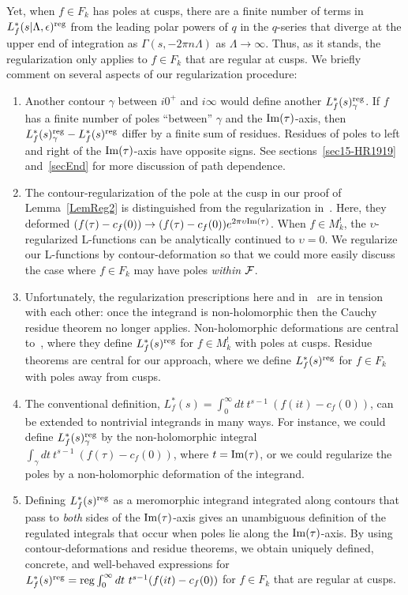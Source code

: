 \documentclass[11pt,a4paper]{article}
\newcommand{\g}{\gamma}
\newcommand{\e}{\epsilon}
\newcommand{\G}{\Gamma}
\newcommand{\La}{\Lambda}
\newcommand{\up}{\upsilon}
\newcommand{\reg}{{\rm reg}}
\begin{document}
Yet, when $f \in F_k$ has poles at cusps, there are a finite number of terms in $L_f^*(s|\La,\e)^\reg$ from the leading polar powers of $q$ in the $q$-series that diverge at the upper end of integration as $\G(s,-2\pi n \La)$ as $\La \to \infty$. Thus, as it stands, the regularization only applies to $f \in F_k$ that are regular at cusps. We briefly comment on several aspects of our regularization procedure:
\begin{enumerate}
\item Another contour $\g$ between $i0^+$ and $i \infty$ would define another $L_f^*(s)^\reg_{\g}$. If $f$ has a finite number of poles ``between'' $\g$ and the ${\rm Im}(\tau)$-axis, then $L_f^*(s)^\reg_{\g} - L_f^*(s)^\reg$ differ by a finite sum of residues. Residues of poles to left and right of the ${\rm Im}(\tau)$-axis have opposite signs. See sections~\ref{sec15-HR1919} and~\ref{secEnd} for more discussion of path dependence.
\item The contour-regularization of the pole at the cusp in our proof of Lemma~\ref{LemReg2} is distinguished from the regularization in~\cite{03-BFI, 04-BFK, 05-BFK2}. Here, they deformed $(f(\tau)-c_f(0)) \to (f(\tau)-c_f(0)) e^{2 \pi \up {\rm Im}(\tau)}$. When $f \in M_k^!$, the $\up$-regularized L-functions can be analytically continued to $\up = 0$. We regularize our L-functions by contour-deformation so that we could more easily discuss the case where $f \in F_k$ may have poles {\em within} ${\cal F}$. 
\item Unfortunately, the regularization prescriptions here and in~\cite{04-BFK} are in tension with each other: once the integrand is non-holomorphic then the Cauchy residue theorem no longer applies. Non-holomorphic deformations are central to~\cite{04-BFK}, where they define $L_f^*(s)^\reg$ for $f \in M_k^!$ with poles at cusps. Residue theorems are central for our approach, where we define $L_f^*(s)^\reg$ for $f \in F_k$ with poles away from cusps.
\item The conventional definition, $L_f^*(s) = \int_{0}^{\infty} dt~t^{s-1}~(f(it)-c_f(0))$, can be extended to nontrivial integrands in many ways. For instance, we could define $L_f^*(s)_\g^\reg$ by the non-holomorphic integral $\int_\g dt~t^{s-1}~(f(\tau)-c_f(0))$, where $t = {\rm Im}(\tau)$, or we could regularize the poles by a non-holomorphic deformation of the integrand. 
\item Defining $L_f^*(s)^\reg$ as a meromorphic integrand integrated along contours that pass to {\em both} sides of the ${\rm Im}(\tau)$-axis gives an unambiguous definition of the regulated integrals that occur when poles lie along the ${\rm Im}(\tau)$-axis. By using contour-deformations and residue theorems, we obtain uniquely defined, concrete, and well-behaved expressions for $L_f^*(s)^\reg = \reg \int_{0}^{\infty} dt~t^{s-1}(f(it)-c_f(0))$ for $f \in F_k$ that are regular at cusps.
\end{enumerate}
\end{document}
